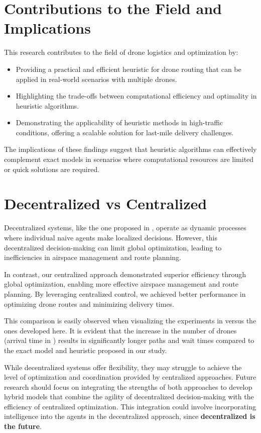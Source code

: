 \section{Contributions to the Field and Implications}
This research contributes to the field of drone logistics and optimization by:
\begin{itemize}
    \item Providing a practical and efficient heuristic for drone routing that can be applied in real-world scenarios with multiple drones.
    \item Highlighting the trade-offs between computational efficiency and optimality in heuristic algorithms.
    \item Demonstrating the applicability of heuristic methods in high-traffic conditions, offering a scalable solution for last-mile delivery challenges.
\end{itemize}

The implications of these findings suggest that heuristic algorithms can effectively complement exact models in scenarios where computational resources are limited or quick solutions are required.


\section{Decentralized vs Centralized}

Decentralized systems, like the one proposed in \cite{Verri}, operate as dynamic processes where individual naive agents make localized decisions. However, this decentralized decision-making can limit global optimization, leading to inefficiencies in airspace management and route planning.

In contrast, our centralized approach demonstrated superior efficiency through global optimization, enabling more effective airspace management and route planning. By leveraging centralized control, we achieved better performance in optimizing drone routes and minimizing delivery times.

This comparison is easily observed when visualizing the experiments in  versus the ones developed here. It is evident that the increase in the number of drones (arrival time in ) results in significantly longer paths and wait times compared to the exact model and heuristic proposed in our study.

While decentralized systems offer flexibility, they may struggle to achieve the level of optimization and coordination provided by centralized approaches. Future research should focus on integrating the strengths of both approaches to develop hybrid models that combine the agility of decentralized decision-making with the efficiency of centralized optimization. This integration could involve incorporating intelligence into the agents in the decentralized approach, since \textbf{decentralized is the future}.







